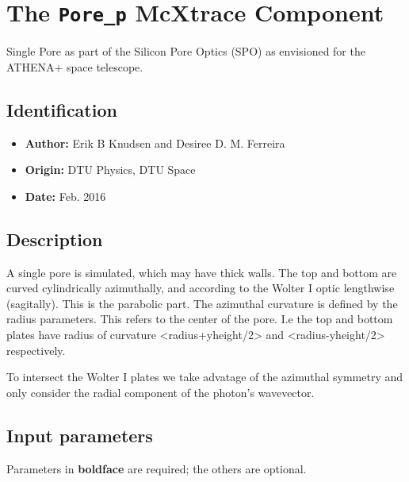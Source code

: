 \section{The \texttt{Pore\_p} McXtrace Component}
Single Pore as part of the Silicon Pore Optics (SPO) as envisioned for the ATHENA+ space telescope.

\subsection*{Identification}
\begin{itemize}
  \item \textbf{Author:} Erik B Knudsen and Desiree D. M. Ferreira
  \item \textbf{Origin:} DTU Physics, DTU Space
  \item \textbf{Date:} Feb. 2016
\end{itemize}

\subsection*{Description}
A single pore is simulated, which may have thick walls. The top and bottom are curved cylindrically azimuthally, and according to the Wolter I optic lengthwise (sagitally). This is the parabolic part. The azimuthal curvature is defined by the radius parameters. This refers to the center of the pore. I.e the top and bottom plates have radius of curvature \textless{}radius+yheight/2\textgreater{} and \textless{}radius-yheight/2\textgreater{} respectively.

To intersect the Wolter I plates we take advatage of the azimuthal symmetry and only consider the radial component of the photon's wavevector.

\subsection*{Input parameters}
Parameters in \textbf{boldface} are required; the others are optional.

